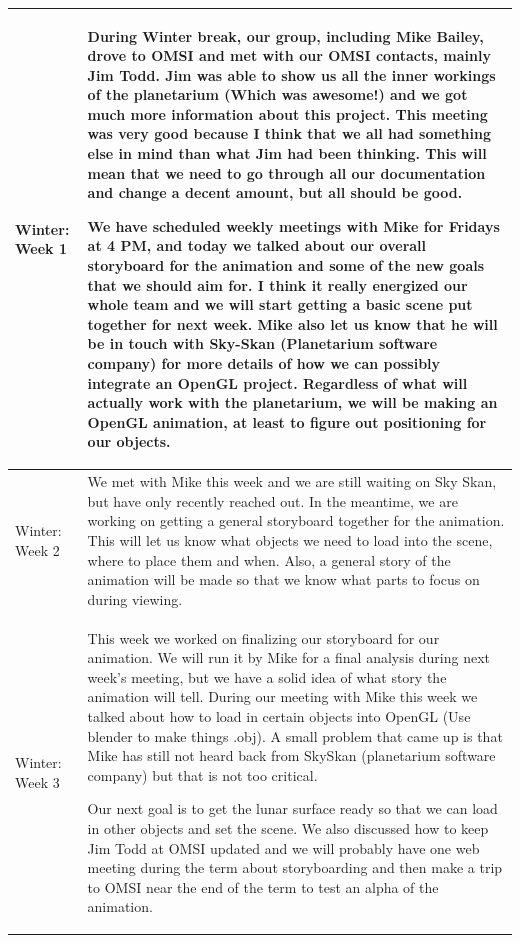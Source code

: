 \documentclass[onecolumn, draftclsnofoot,10pt, compsoc]{IEEEtran}
\begin{document}
\begin{longtable} {|p{1.5cm}|p{13.5cm}|}
Winter: Week 1 &
During Winter break, our group, including Mike Bailey, drove to OMSI and met with our OMSI contacts, mainly Jim Todd. Jim was able to show us all the inner workings of the planetarium (Which was awesome!) and we got much more information about this project. This meeting was very good because I think that we all had something else in mind than what Jim had been thinking. This will mean that we need to go through all our documentation and change a decent amount, but all should be good.

We have scheduled weekly meetings with Mike for Fridays at 4 PM, and today we talked about our overall storyboard for the animation and some of the new goals that we should aim for. I think it really energized our whole team and we will start getting a basic scene put together for next week. Mike also let us know that he will be in touch with Sky-Skan (Planetarium software company) for more details of how we can possibly integrate an OpenGL project. Regardless of what will actually work with the planetarium, we will be making an OpenGL animation, at least to figure out positioning for our objects. \\ \hline

Winter: Week 2 & 
We met with Mike this week and we are still waiting on Sky Skan, but have only recently reached out. In the meantime, we are working on getting a general storyboard together for the animation. This will let us know what objects we need to load into the scene, where to place them and when. Also, a general story of the animation will be made so that we know what parts to focus on during viewing. 
\\ \hline

Winter: Week 3 &
This week we worked on finalizing our storyboard for our animation. We will run it by Mike for a final analysis during next week's meeting, but we have a solid idea of what story the animation will tell. During our meeting with Mike this week we talked about how to load in certain objects into OpenGL (Use blender to make things .obj). A small problem that came up is that Mike has still not heard back from SkySkan (planetarium software company) but that is not too critical. 

Our next goal is to get the lunar surface ready so that we can load in other objects and set the scene. We also discussed how to keep Jim Todd at OMSI updated and we will probably have one web meeting during the term about storyboarding and then make a trip to OMSI near the end of the term to test an alpha of the animation. 
 \\ \hline


\end{longtable}
\end{document}
